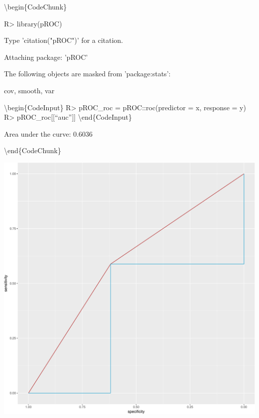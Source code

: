 \documentclass[article]{jss}
\begin{document}
\textbackslash{}begin\{CodeChunk\}

\begin{CodeInput}
R> library(pROC)
\end{CodeInput}

\begin{CodeOutput}
Type 'citation("pROC")' for a citation.
\end{CodeOutput}

\begin{CodeOutput}

Attaching package: 'pROC'
\end{CodeOutput}

\begin{CodeOutput}
The following objects are masked from 'package:stats':

    cov, smooth, var
\end{CodeOutput}

\textbackslash{}begin\{CodeInput\} R\textgreater{} pROC\_roc =
pROC::roc(predictor = x, response = y) R\textgreater{}
pROC\_roc{[}{[}``auc''{]}{]} \textbackslash{}end\{CodeInput\}

\begin{CodeOutput}
Area under the curve: 0.6036
\end{CodeOutput}

\textbackslash{}end\{CodeChunk\}

\begin{CodeChunk}


\begin{center}\includegraphics{index_files/figure-latex/unnamed-chunk-13-1} \end{center}

\end{CodeChunk}
\end{document}
